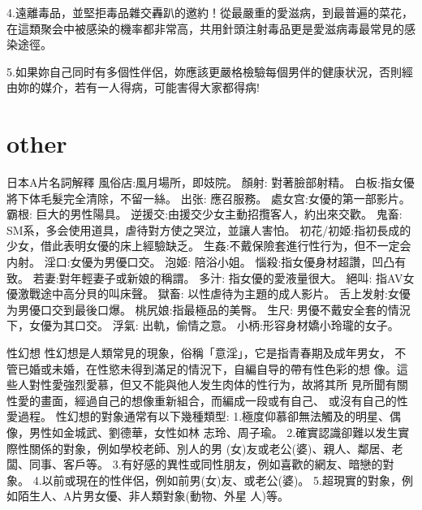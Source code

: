 \documentclass[12pt,UTF8]{ctexbook}
\begin{document}
4.遠離毒品，並堅拒毒品雜交轟趴的邀約！從最嚴重的愛滋病，到最普遍的菜花，在這類聚会中被感染的機率都非常高，共用針頭注射毒品更是愛滋病毒最常見的感染途徑。

5.如果妳自己同时有多個性伴侶，妳應該更嚴格檢驗每個男伴的健康状況，否則經由妳的媒介，若有一人得病，可能害得大家都得病!

\part{other}

日本A片名詞解釋
風俗店:風月場所，即妓院。
顏射: 對著臉部射精。
白板:指女優將下体毛髮完全清除，不留一絲。
出张: 應召服務。
處女宫:女優的第一部影片。
霸根: 巨大的男性陽具。
逆援交:由援交少女主動招攬客人，約出來交歡。
鬼畜: SM系，多会使用道具，虐待對方使之哭泣，並讓人害怕。
初花/初姬:指初長成的少女，借此表明女優的床上經驗缺乏。
生姦:不戴保險套進行性行为，但不一定会内射。
淫口:女優为男優口交。
泡姬: 陪浴小姐。
惱殺:指女優身材超讚，凹凸有致。
若妻:對年輕妻子或新娘的稱謂。
多汁: 指女優的愛液量很大。
絕叫: 指AV女優激戰途中高分貝的叫床聲。
獄畜: 以性虐待为主題的成人影片。
舌上发射:女優为男優口交到最後口爆。
桃尻娘:指最極品的美臀。
生尺: 男優不戴安全套的情況下，女優为其口交。
浮氣: 出軌，偷情之意。
小柄:形容身材嬌小玲瓏的女子。

性幻想
性幻想是人類常見的現象，俗稱「意淫」，它是指青春期及成年男女，
不管已婚或未婚，在性慾未得到滿足的情況下，自編自导的帶有性色彩的想
像。這些人對性愛強烈愛慕，但又不能與他人发生肉体的性行为，故將其所
見所聞有關性愛的畫面，經過自己的想像重新組合，而編成一段或有自己、
或沒有自己的性愛過程。
性幻想的對象通常有以下幾種類型:
1.極度仰慕卻無法觸及的明星、偶像，男性如金城武、劉德華，女性如林
志玲、周子瑜。
2.確實認識卻難以发生實際性關係的對象，例如學校老師、別人的男
(女)友或老公(婆)、親人、鄰居、老闆、同事、客戶等。
3.有好感的異性或同性朋友，例如喜歡的網友、暗戀的對象。
4.以前或現在的性伴侶，例如前男(女)友、或老公(婆)。
5.超現實的對象，例如陌生人、A片男女優、非人類對象(動物、外星
人)等。
\end{document}

